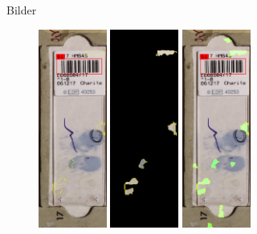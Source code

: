 \documentclass{beamer}
\begin{document}
  \begin{frame}{Bilder}
    \begin{figure}
      \includegraphics[width=0.2\textwidth]{./assets/Cell100426_1_7_top1_positiveonlywithrest.PNG}
      \hfill
      \includegraphics[width=0.2\textwidth]{./assets/Cell100426_1_7_top1_positiveonly.PNG}
      \hfill
      \includegraphics[width=0.2\textwidth]{./assets/Cell100426_1_7_top1_proscons.PNG}

\end{figure}
\end{frame}
\end{document}
